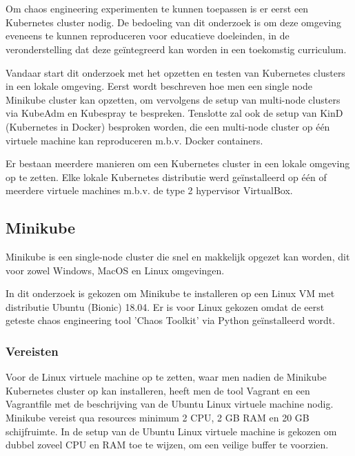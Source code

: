 
\chapter{}
\label{ch:lokaleclusters}

Om chaos engineering experimenten te kunnen toepassen is er eerst een Kubernetes cluster nodig. De bedoeling van dit onderzoek is om deze omgeving eveneens te kunnen reproduceren voor educatieve doeleinden, in de veronderstelling dat deze geïntegreerd kan worden in een toekomstig curriculum.

Vandaar start dit onderzoek met het opzetten en testen van Kubernetes clusters in een lokale omgeving. 
Eerst wordt beschreven hoe men een single node Minikube cluster kan opzetten, om vervolgens de setup van multi-node clusters via KubeAdm en Kubespray te bespreken. Tenslotte zal ook de setup van KinD (Kubernetes in Docker) besproken worden, die een multi-node cluster op één virtuele machine kan reproduceren m.b.v. Docker containers.

Er bestaan meerdere manieren om een Kubernetes cluster in een lokale omgeving op te zetten. 
Elke lokale Kubernetes distributie werd geïnstalleerd op één of meerdere virtuele machines m.b.v. de type 2 hypervisor VirtualBox. 

\section{Minikube}

Minikube is een single-node cluster die snel en makkelijk opgezet kan worden, dit voor zowel Windows, MacOS en Linux omgevingen. \autocite{Minikube2022}

In dit onderzoek is gekozen om Minikube te installeren op een Linux VM met distributie Ubuntu (Bionic) 18.04. Er is voor Linux gekozen omdat de eerst geteste chaos engineering tool 'Chaos Toolkit' via Python geïnstalleerd wordt. 

\subsection{Vereisten}

Voor de Linux virtuele machine op te zetten, waar men nadien de Minikube Kubernetes cluster op kan installeren, heeft men de tool Vagrant en een Vagrantfile met de beschrijving van de Ubuntu Linux virtuele machine nodig. Minikube vereist qua resources minimum 2 CPU, 2 GB RAM en 20 GB schijfruimte. In de setup van de Ubuntu Linux virtuele machine is gekozen om dubbel zoveel CPU en RAM toe te wijzen, om een veilige buffer te voorzien.  

